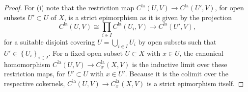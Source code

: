 \documentclass[a4paper, reqno, 10pt]{amsart}
\theoremstyle{definition}
\numberwithin{equation}{section}
\newcommand{\la}{{\mathrm{la}}}
\newcommand{\lra}{\longrightarrow}
\newcommand{\ra}{\rightarrow}
\begin{document}
\begin{proof}
	For (i) note that the restriction map $C^\la(U,V) \ra C^\la(U',V)$, for open subsets $U'\subset U$ of $X$, is a strict epimorphism as it is given by the projection 
	\begin{equation*}
		C^\la(U,V) \cong \prod_{i\in I} C^\la(U_i,V) \lra C^\la(U',V),
	\end{equation*}
	for a suitable disjoint covering $U = \bigcup_{i\in I} U_i$ by open subsets such that $U'\in \left\{U_i\right\}_{i\in I}$.
	For a fixed open subset $U\subset X$ with $x\in U$, the canonical homomorphism $C^\la(U,V) \ra C^\la_x(X,V)$ is the inductive limit over these restriction maps, for $U'\subset U$ with $x\in U'$.
	Because it is the colimit over the respective cokernels, $C^\la(U,V) \ra C^\la_x(X,V)$ is a strict epimorphism itself.
	

\end{proof}
\end{document}
